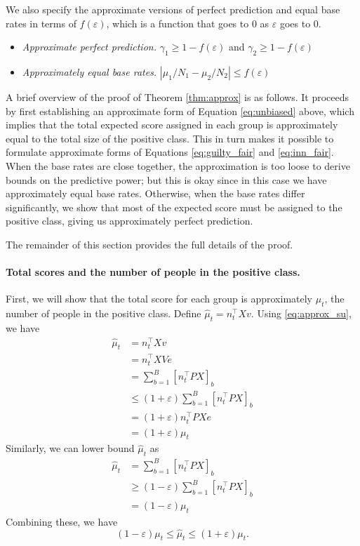 \documentclass[11pt]{article}
\newcommand{\xhdr}[1]{\vspace{-0.2in} \paragraph*{\bf {#1}.}}
\def\tran{^{\top}}
\begin{document}
We also specify the approximate versions of perfect prediction and equal base
rates in terms of $f(\varepsilon)$, which is a function that goes to 0 as
$\varepsilon$ goes to 0.
\begin{itemize}
  \item {\em Approximate perfect prediction.} $\gamma_1 \ge 1 - f(\varepsilon)$
    and $\gamma_2 \ge 1 - f(\varepsilon)$
  \item {\em Approximately equal base rates.} $|\mu_1/N_1 - \mu_2/N_2| \le
    f(\varepsilon)$
\end{itemize}

A brief overview of the proof of Theorem \ref{thm:approx} is
as follows.  It proceeds 
by first establishing an approximate form of Equation 
\eqref{eq:unbiased} above, which implies that the total 
expected score assigned
in each group is approximately equal to the total size of the positive class.
This in turn makes it possible to formulate approximate forms of 
Equations \eqref{eq:guilty_fair} and \eqref{eq:inn_fair}.
When the base rates are close together, the approximation is too loose to derive
bounds on the predictive power; but this is okay since in this case we have
approximately equal base rates. Otherwise, when the base rates differ
significantly, we show that most of the expected score must be assigned to the
positive class, giving us approximately perfect prediction.

The remainder of this section provides the full details of the proof.

\xhdr{Total scores and the number of people in the positive class}
First, we will show that
the total score for each group is approximately $\mu_t$, the number of people in
the positive class. Define $\hat \mu_t =
n_t\tran Xv$. Using
\eqref{eq:approx_su}, we have
\begin{align*}
  \hat \mu_t &= n_t\tran Xv \\
  &= n_t\tran XVe \\
  &= \sum_{b=1}^B [n_t\tran PX]_b \\
  &\le (1+\varepsilon) \sum_{b=1}^B [n_t\tran PX]_b \\
  &= (1+\varepsilon) n_t\tran PXe \\
  &= (1+\varepsilon) \mu_t
\end{align*}
Similarly, we can lower bound $\hat \mu_t$ as
\begin{align*}
  \hat \mu_t &= \sum_{b=1}^B [n_t\tran PX]_b \\
  &\ge (1-\varepsilon) \sum_{b=1}^B [n_t\tran PX]_b \\
  &= (1-\varepsilon) \mu_t
\end{align*}
Combining these, we have
\begin{equation}
  (1-\varepsilon) \mu_t \le \hat \mu_t \le (1+\varepsilon) \mu_t.
  \label{eq:approx_mu}
\end{equation}
\end{document}
